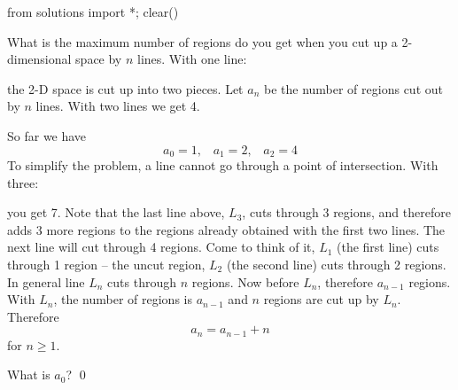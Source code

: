 \begin{python0}
from solutions import *; clear() 
\end{python0}

What is the maximum number of regions do you get when you
cut up a 2-dimensional space by $n$ lines.
With one line:

the 2-D space is cut up into two pieces.
Let $a_n$ be the number of regions cut out by $n$ lines.
With two lines we get 4.

So far we have
\[
a_0 = 1, \,\,\,\,\,
a_1 = 2, \,\,\,\,\,
a_2 = 4
\]
To simplify the problem, a line cannot go through a point of
intersection.
With three:

you get 7.
Note that the last line above, $L_3$, cuts through 3 regions,
and therefore adds 3 more
regions to the regions already obtained with the first two lines.
The next line will cut through 4 regions.
Come to think of it, $L_1$ (the first line) cuts through 1 region --
the uncut region,
$L_2$ (the second line) cuts through
2 regions.
In general line $L_n$ cuts through $n$ regions.
Now before $L_n$, therefore $a_{n-1}$ regions.
With $L_n$, the number of regions is $a_{n-1}$ and
$n$ regions are cut up by $L_n$. 
Therefore
\[
a_n = a_{n-1} + n
\]
for $n \geq 1$.


\newpage
\begin{ex}
What is $a_0$?
\qed
\end{ex}


